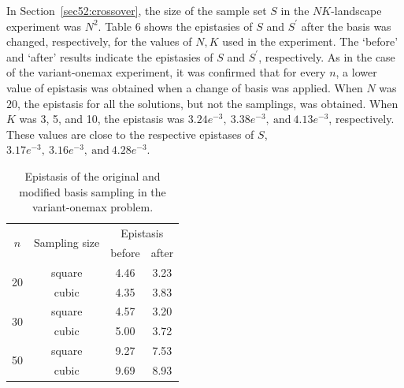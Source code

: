 In Section~\ref{sec52:crossover}, the size of the sample set $ S $ in the $ NK $-landscape experiment was $ N^2 $. Table 6 shows the epistasies of $ S $ and $ S^\prime $ after the basis was changed, respectively, for the values of $ N,K $ used in the experiment. The `before' and `after' results indicate the epistasies of $ S $ and $ S^\prime $, respectively. As in the case of the variant-onemax experiment, it was confirmed that for every $ n $, a lower value of epistasis was obtained when a change of basis was applied. When $ N $ was $ 20 $, the epistasis for all the solutions, but not the samplings, was obtained. When $ K $ was 3, 5, and 10, the epistasis was $ 3.24e^{-3},\ 3.38e^{-3},\ \text{and}\ 4.13e^{-3} $, respectively. These values are close to the respective epistases of $ S $, $ 3.17e^{-3},\ 3.16e^{-3},\ \text{and}\ 4.28e^{-3} $.


\begin{table}[ht!]
	\caption{Epistasis of the original and modified basis sampling in the variant-onemax problem.} \label{tab:epi_var}
	\vspace*{0.2cm}
	\centering
	\begin{tabular}{cccc}
		\toprule
		\multirow{2}{*}{$ n $} & \multirow{2}{*}{Sampling size} & \multicolumn{2}{c}{Epistasis} \\	\cmidrule(lr){3-4}
		
		& & before & after \\
		\midrule
		\multirow{2}{*}{20} & square	& 4.46 & 3.23 \\
		& cubic		& 4.35 & 3.83 \\
		\midrule
		\multirow{2}{*}{30} & square	& 4.57 & 3.20 \\
		& cubic		& 5.00 & 3.72 \\
		\midrule
		\multirow{2}{*}{50} & square	& 9.27 & 7.53 \\
		& cubic		& 9.69 & 8.93 \\
		\bottomrule
	\end{tabular}
\end{table}

